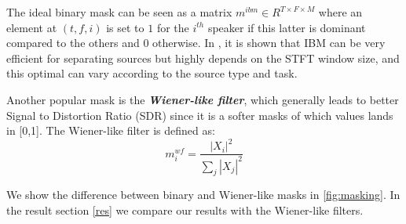 \documentclass[master, tikz, final,11pt, dvipdfmx]{iscs-thesis}
\begin{document}
The ideal binary mask can be seen as a matrix $m^{ibm} \in R^{T\times F \times M}$ where an element at $(t,f,i)$ is set to $1$ for the $i^{th}$ speaker if this latter is dominant compared to the others and $0$ otherwise. In \cite{IBM}, it is shown that IBM can be very efficient for separating sources but highly depends on the STFT window size, and this optimal can vary according to the source type and task.

Another popular mask is the \textit{\textbf{Wiener-like filter}}, which generally leads to better Signal to Distortion Ratio (SDR) since it is a softer masks of which values lands in [0,1]. The Wiener-like filter is defined as:
\[
m^{wf}_i = \frac{|X_i|^2}{\sum_j{|X_j|^2}} 
\]

We show the difference between binary and Wiener-like masks in \autoref{fig:masking}.
In the result section \ref{res} we compare our results with the Wiener-like filters.
\end{document}

